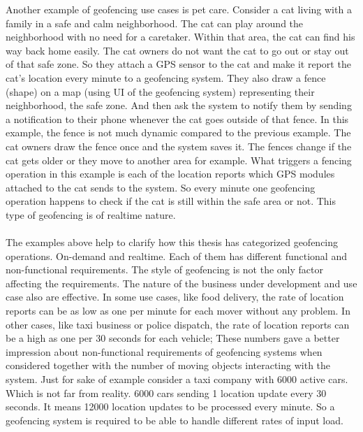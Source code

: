 \documentclass[a4]{report}
\begin{document}
    Another example of geofencing use cases is pet care\cite{pet-geofencing}.
    Consider a cat living with a family in a safe and calm neighborhood.
    The cat can play around the neighborhood with no need for a caretaker.
    Within that area, the cat can find his way back home easily.
    The cat owners do not want the cat to go out or stay out of that safe zone.
    So they attach a GPS sensor to the cat and make it report the cat's location every minute to a geofencing system.
    They also draw a fence (shape) on a map (using UI of the geofencing system) representing their neighborhood, the safe zone.
    And then ask the system to notify them by sending a notification to their phone whenever the cat goes outside
    of that fence.
    In this example, the fence is not much dynamic compared to the previous example.
    The cat owners draw the fence once and the system saves it.
    The fences change if the cat gets older or they move to another area for example.
    What triggers a fencing operation in this example is each of the location reports which GPS modules attached to the cat sends to the system.
    So every minute one geofencing operation happens to check if the cat is still within the safe area or
    not.
    This type of geofencing is of realtime nature.

    \paragraph{}
    The examples above help to clarify how this thesis has categorized geofencing operations.
    On-demand and realtime.
    Each of them has different functional and non-functional requirements.
    The style of geofencing is not the only factor affecting the requirements.
    The nature of the business under development and use case also are effective.
    In some use cases, like food delivery, the rate of location reports can be as low as one per minute for each mover without any problem.
    In other cases, like taxi business or police dispatch, the rate of location reports can be a high as one per 30
    seconds for each vehicle;
    These numbers gave a better impression about non-functional requirements of geofencing systems when considered
    together with the number of moving objects interacting with the system.
    Just for sake of example consider a taxi company with 6000 active cars.
    Which is not far from reality.
    6000 cars sending 1 location update every 30 seconds.
    It means 12000 location updates to be processed every minute.
    So a geofencing system is required to be able to handle different rates of input load.
\end{document}
